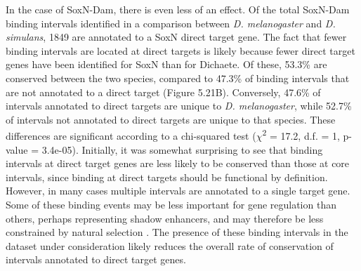 In the case of SoxN-Dam, there is even less of an effect. Of the total SoxN-Dam binding intervals identified in a comparison between \emph{D. melanogaster} and \emph{D. simulans}, 1849 are annotated to a SoxN direct target gene. The fact that fewer binding intervals are located at direct targets is likely because fewer direct target genes have been identified for SoxN than for Dichaete. Of these, 53.3\% are conserved between the two species, compared to 47.3\% of binding intervals that are not annotated to a direct target (Figure 5.21B). Conversely, 47.6\% of intervals annotated to direct targets are unique to \emph{D. melanogaster}, while 52.7\% of intervals not annotated to direct targets are unique to that species. These differences are significant according to a chi-squared test (\(\chi\)\textsuperscript{2} = 17.2, d.f. = 1, p-value = 3.4e-05). Initially, it was somewhat surprising to see that binding intervals at direct target genes are less likely to be conserved than those at core intervals, since binding at direct targets should be functional by definition. However, in many cases multiple intervals are annotated to a single target gene. Some of these binding events may be less important for gene regulation than others, perhaps representing shadow enhancers, and may therefore be less constrained by natural selection \citep{ludwig_consequences_2011,perry_shadow_2010}. The presence of these binding intervals in the dataset under consideration likely reduces the overall rate of conservation of intervals annotated to direct target genes.

